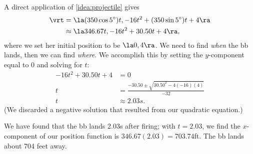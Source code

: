 {A direct application of \autoref{idea:projectile} gives
\begin{align*}
\vrt &= \la (350\cos 5^\circ)t, -16t^2 + (350\sin 5^\circ)t + 4\ra\\
&\approx \la 346.67t, -16t^2+30.50t+4\ra,
\end{align*}
where we set her initial position to be $\la 0,4\ra$.
We need to find \emph{when} the bb lands, then we can find \emph{where}. We accomplish this by setting the $y$-component equal to 0 and solving for $t$:
\begin{align*}
-16t^2+30.50t+4 &= 0 \\
t &= \frac{-30.50 \pm \sqrt{30.50^2-4(-16)(4)}}{-32}\\
t &\approx 2.03s.
\end{align*}
(We discarded a negative solution that resulted from our quadratic equation.) 

We have found that the bb lands 2.03s after firing; with $t=2.03$, we find the $x$-component of our position function is $346.67(2.03) = 703.74$ft. The bb lands about 704 feet away.}

